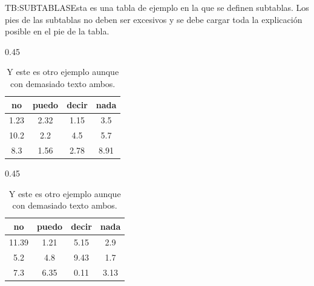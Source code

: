 \begin{table}[Tabla de ejemplo con subtablas]{TB:SUBTABLAS}{Esta es una tabla de ejemplo en la que se definen subtablas. Los pies de las subtablas no deben ser excesivos y se debe cargar toda la explicación posible en el pie de la tabla.}

    \begin{subtable}[t]{0.45\linewidth}
    \centering
    \begin{tabular}{cccc}
      \hline
      \textbf{no} & \textbf{puedo} & \textbf{decir} & \textbf{nada} \\
      \hline \hline
      1.23 & 2.32 & 1.15 & 3.5 \\
      10.2 & 2.2 & 4.5 & 5.7 \\
      8.3 & 1.56 & 2.78 & 8.91 \\
      \hline
    \end{tabular}
    \caption{Esta es una subtabla, y su pie no debe ser demasiado largo.}\label{STB:EJ1}
  \end{subtable}
    \begin{subtable}[t]{0.45\linewidth}
    \centering
    \begin{tabular}{cccc}
      \hline
      \textbf{no} & \textbf{puedo} & \textbf{decir} & \textbf{nada} \\
      \hline \hline
      11.39 & 1.21 & 5.15 & 2.9 \\
      5.2 & 4.8 & 9.43 & 1.7 \\
      7.3 & 6.35 & 0.11 & 3.13 \\
      \hline
    \end{tabular}
    \caption{Y este es otro ejemplo aunque con demasiado texto ambos.}\label{STB:EJ2}
  \end{subtable}
\end{table}
